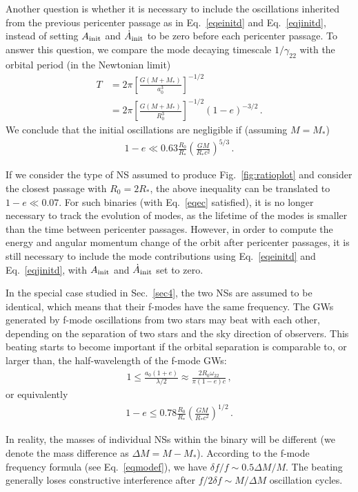 \documentclass[prd,aps,floatfix,superscriptaddress,nofootinbib,twocolumn,10pt,English]{revtex4}
\begin{document}
Another question is whether it is necessary to include the oscillations
inherited from the previous pericenter passage as in Eq.~\eqref{eqeinitd} and
Eq.~\eqref{eqjinitd}, instead of setting $A_{\rm init}$ and $\dot{A}_{\rm init}$ to
be zero before each pericenter passage. To answer this question, we compare the
mode decaying timescale $1/\gamma_{22}$ with the orbital period (in the
Newtonian limit)
\begin{align}
T & = 2 \pi \left [\frac{G (M+M_*)}{a_0^3} \right ]^{-1/2} \nonumber \\
&= 2 \pi \left [ \frac{G (M+M_*)}{R_0^3} \right ]^{-1/2} (1-e)^{-3/2}\,.
\end{align}
We conclude that the initial oscillations are negligible if (assuming $M=M_*$)
\begin{align}\label{eqec}
1-e \ll 0.63 \frac{R_0}{R_*} \left ( \frac{G M}{R_* c^2}\right )^{5/3}\,.
\end{align}

If we consider the type of NS assumed to produce Fig.~\ref{fig:ratioplot} and
consider the closest passage with $R_0 = 2 R_*$, the above inequality can be
translated to $1-e \ll 0.07$.  For such binaries (with Eq.~\eqref{eqec}
satisfied), it is no longer necessary to track the evolution of modes, as the
lifetime of the modes is smaller than the time between pericenter
passages. However, in order to compute the energy and angular momentum change
of the orbit after pericenter passages, it is still necessary to include the
mode contributions using Eq.~\eqref{eqeinitd} and Eq.~\eqref{eqjinitd}, with
$A_{\rm init}$ and $\dot{A}_{\rm init}$ set to zero.

In the special case studied in Sec.~\ref{sec4}, the two NSs are assumed to be
identical, which means that their f-modes have the same frequency. The GWs
generated by f-mode oscillations from two stars may beat with each other,
depending on the separation of two stars and the sky direction of observers.
This beating starts to become important if the orbital separation is comparable to,
or larger than, the half-wavelength of the f-mode GWs:
\begin{align}
1\le \frac{a_0(1+e)}{\lambda/2} \approx \frac{2 R_0 \omega_{22}}{\pi (1-e) c}\,,
\end{align}
or equivalently
\begin{align}
1-e \le  0.78 \frac{R_0}{R_*} \left ( \frac{G M}{R_* c^2}\right )^{1/2}\,.
\end{align}

In reality, the masses of individual NSs within the binary will be different
(we denote the mass difference as $\Delta M=M-M_*$). According to the f-mode
frequency formula (see Eq.~\eqref{eqmodef}), we have $\delta f/ f \sim 0.5
\Delta M/M$. The beating generally loses constructive interference after $f/2\delta f \sim 
M/\Delta M$ oscillation cycles. 
\end{document}
